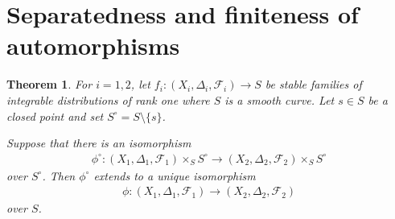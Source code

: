\documentclass[12pt, a4paper]{amsart}
\newcounter{Theorem}
\newtheorem{theorem}{Theorem}[section]
\theoremstyle{definition}
\theoremstyle{named}
\begin{document}
    \section{Separatedness and finiteness of automorphisms}




\begin{theorem} 
\label{thm_separatedness}
For $i = 1, 2$, let $f_i\colon (X_i, \Delta_i, \mathcal F_i) \rightarrow S$
be stable families of integrable distributions of rank one
where $S$ is a smooth curve.
Let $s \in S$ be a closed point and set $S^\circ = S \setminus \{s\}$.

Suppose that there is an isomorphism
\begin{align*}\phi^\circ\colon (X_1, \Delta_1, \mathcal F_1)\times_SS^\circ \rightarrow (X_2, \Delta_2, \mathcal F_2)\times_SS^\circ\end{align*}
over $S^\circ$.
Then $\phi^\circ$ extends to a unique isomorphism
\begin{align*}\phi\colon (X_1, \Delta_1, \mathcal F_1) \rightarrow (X_2, \Delta_2, \mathcal F_2)\end{align*}
over $S$.
\end{theorem}
\end{document}
